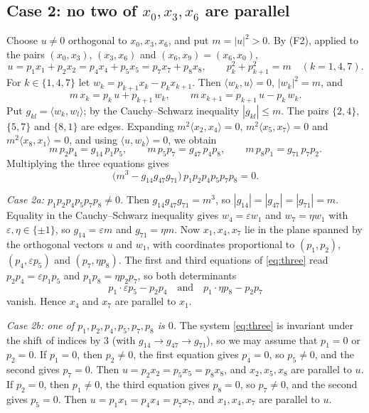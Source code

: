 \documentclass[11pt]{amsart}
\theoremstyle{definition}
\theoremstyle{remark}
\newcommand{\ip}[2]{\langle #1,#2\rangle}
\begin{document}
\subsection*{Case 2: no two of $x_0,x_3,x_6$ are parallel}
Choose $u\ne0$ orthogonal to $x_0,x_3,x_6$, and put $m=|u|^2>0$.
By (F2), applied to the pairs $(x_0,x_3)$, $(x_3,x_6)$ and $(x_6,x_9)=(x_6,x_0)$,
\[
u=p_1x_1+p_2x_2=p_4x_4+p_5x_5=p_7x_7+p_8x_8,
\qquad p_k^2+p_{k+1}^2=m\quad(k=1,4,7).
\]
For $k\in\{1,4,7\}$ let $w_k=p_{k+1}x_k-p_kx_{k+1}$.
Then $\ip{w_k}{u}=0$, $|w_k|^2=m$, and
\[
m\,x_k=p_k\,u+p_{k+1}\,w_k,\qquad m\,x_{k+1}=p_{k+1}\,u-p_k\,w_k .
\]
Put $g_{kl}=\ip{w_k}{w_l}$; by the Cauchy--Schwarz inequality $|g_{kl}|\le m$.
The pairs $\{2,4\}$, $\{5,7\}$ and $\{8,1\}$ are edges.
Expanding $m^2\ip{x_2}{x_4}=0$, $m^2\ip{x_5}{x_7}=0$ and $m^2\ip{x_8}{x_1}=0$, and using $\ip{u}{w_k}=0$, we obtain
\begin{equation}\label{eq:three}
m\,p_2p_4=g_{14}\,p_1p_5,\qquad m\,p_5p_7=g_{47}\,p_4p_8,\qquad m\,p_8p_1=g_{71}\,p_7p_2 .
\end{equation}
Multiplying the three equations gives
\[
\bigl(m^3-g_{14}g_{47}g_{71}\bigr)\,p_1p_2p_4p_5p_7p_8=0 .
\]

\emph{Case 2a: $p_1p_2p_4p_5p_7p_8\ne0$.}
Then $g_{14}g_{47}g_{71}=m^3$, so $|g_{14}|=|g_{47}|=|g_{71}|=m$.
Equality in the Cauchy--Schwarz inequality gives $w_4=\varepsilon w_1$ and $w_7=\eta w_1$ with $\varepsilon,\eta\in\{\pm1\}$, so $g_{14}=\varepsilon m$ and $g_{71}=\eta m$.
Now $x_1,x_4,x_7$ lie in the plane spanned by the orthogonal vectors $u$ and $w_1$, with coordinates proportional to $(p_1,p_2)$, $(p_4,\varepsilon p_5)$ and $(p_7,\eta p_8)$.
The first and third equations of \eqref{eq:three} read $p_2p_4=\varepsilon p_1p_5$ and $p_1p_8=\eta p_2p_7$, so both determinants
\[
p_1\cdot\varepsilon p_5-p_2p_4\quad\text{and}\quad p_1\cdot\eta p_8-p_2p_7
\]
vanish.
Hence $x_4$ and $x_7$ are parallel to $x_1$.

\emph{Case 2b: one of $p_1,p_2,p_4,p_5,p_7,p_8$ is $0$.}
The system \eqref{eq:three} is invariant under the shift of indices by $3$ (with $g_{14}\to g_{47}\to g_{71}$), so we may assume that $p_1=0$ or $p_2=0$.
If $p_1=0$, then $p_2\ne0$, the first equation gives $p_4=0$, so $p_5\ne0$, and the second gives $p_7=0$.
Then $u=p_2x_2=p_5x_5=p_8x_8$, and $x_2,x_5,x_8$ are parallel to $u$.
If $p_2=0$, then $p_1\ne0$, the third equation gives $p_8=0$, so $p_7\ne0$, and the second gives $p_5=0$.
Then $u=p_1x_1=p_4x_4=p_7x_7$, and $x_1,x_4,x_7$ are parallel to $u$.
\end{document}
